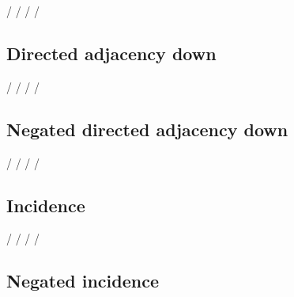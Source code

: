 \documentclass{article}
\begin{document}
{\GTStestText{\GTSxa[n,u]}{\GTSxa[n,u,r]}


\GTStestEqualTextsI{\GTSnDAU/}{\GTSnDAUR/}%
{\GTSnegatedDirectedAdjacencyUp/}%
{\GTSnegatedDirectedAdjacencyUpRelation/}
\GTStestEqualTextsI{\GTSnDAU/}{\GTSnDAUR/}%
{\GTSnegDirAdjUp/}%
{\GTSnegDirAdjUpRel/}

\subsection{Directed adjacency down}

\GTStestText{\GTSdAD/}{\GTSdADR/}

\GTStestText{\GTSxa[d]}{\GTSxa[d,r]}


\GTStestEqualTextsI{\GTSdAD/}{\GTSdADR/}%
{\GTSdirectedAdjacencyDown/}%
{\GTSdirectedAdjacencyDownRelation/}
\GTStestEqualTextsI{\GTSdAD/}{\GTSdADR/}%
{\GTSdirAdjDown/}%
{\GTSdirAdjDownRel/}

\subsection{Negated directed adjacency down}

\GTStestText{\GTSnDAD/}{\GTSnDADR/}

\GTStestText{\GTSxa[n,d]}{\GTSxa[n,d,r]}


\GTStestEqualTextsI{\GTSnDAD/}{\GTSnDADR/}%
{\GTSnegatedDirectedAdjacencyDown/}%
{\GTSnegatedDirectedAdjacencyDownRelation/}
\GTStestEqualTextsI{\GTSnDAD/}{\GTSnDADR/}%
{\GTSnegDirAdjDown/}%
{\GTSnegDirAdjDownRel/}

\subsection{Incidence}

\GTStestTextII{\GTSi/}{\GTSiR/}

\GTStestTextII{\GTSxi[]}{\GTSxi[r]}


\GTStestEqualTextsII{\GTSi/}{\GTSiR/}%
{\GTSincidence/}%
{\GTSincidenceRelation/}
\GTStestEqualTextsII{\GTSi/}{\GTSiR/}%
{\GTSinc/}%
{\GTSincRel/}


\subsection{Negated incidence}

}
\end{document}
